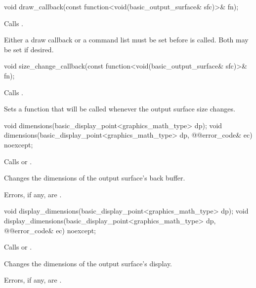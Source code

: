 %
\begin{itemdecl}
void draw_callback(const function<void(basic_output_surface& sfc)>& fn);
\end{itemdecl}
\begin{itemdescr}
\pnum
\effects Calls .

\pnum
\remarks Either a draw callback or a command list must be set before  is called. Both may be set if desired.

\end{itemdescr}

%
\begin{itemdecl}
void size_change_callback(const function<void(basic_output_surface& sfc)>& fn);
\end{itemdecl}
\begin{itemdescr}
\pnum
\effects Calls .

\pnum
\remarks Sets a function that will be called whenever the output surface size changes.
\end{itemdescr}

%
\begin{itemdecl}
void dimensions(basic_display_point<graphics_math_type> dp);
void dimensions(basic_display_point<graphics_math_type> dp, @\stdqualifier{}@error_code& ec) noexcept;
\end{itemdecl}
\begin{itemdescr}
\pnum
\effects Calls  or .

\pnum
\remarks Changes the dimensions of the output surface's back buffer.

\pnum
\errors Errors, if any, are .
\end{itemdescr}

%
\begin{itemdecl}
void display_dimensions(basic_display_point<graphics_math_type> dp);
void display_dimensions(basic_display_point<graphics_math_type> dp, @\stdqualifier{}@error_code& ec) noexcept;
\end{itemdecl}
\begin{itemdescr}
\pnum
\effects Calls  or .

\pnum
\remarks Changes the dimensions of the output surface's display.

\pnum
\errors Errors, if any, are .
\end{itemdescr}

